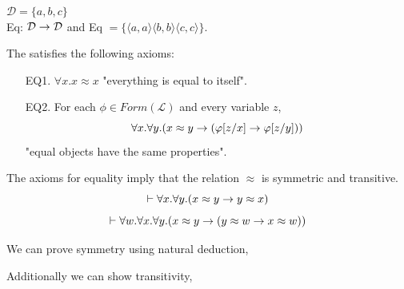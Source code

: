 \documentclass[english, 11pt]{article}
\begin{document}
    \begin{exmp}
      $\mathcal{D} = \{a,b,c\}$ \\
      Eq: $\mathcal{D} \rightarrow \mathcal{D}$ and Eq $= \{\langle a,a\rangle \langle b,b\rangle \langle c, c\rangle \}$.
    \end{exmp}

    The  satisfies the following axioms:
    \begin{itemize}
      \item[EQ1.] $\forall x. x \approx x$ "everything is equal to itself".
      \item[EQ2.] For each $\phi \in Form(\mathcal{L})$ and every variable $z$,
      \[ \forall x. \forall y. (x \approx y \rightarrow (\varphi[z/x] \rightarrow \varphi[z/y])) \]
      "equal objects have the same properties".
    \end{itemize}

    \begin{lem}
      The axioms for equality imply that the relation $\approx$ is symmetric and transitive.
      \[ \vdash \forall x.\forall y. (x \approx y \rightarrow y \approx x) \]
      \[ \vdash \forall w. \forall x. \forall y.(x \approx y \rightarrow (y \approx w \rightarrow x \approx w)) \]
    \end{lem}

    We can prove symmetry using natural deduction,

    \begin{flagderiv}
    \end{flagderiv}

    Additionally we can show transitivity,

    \begin{flagderiv}
    \end{flagderiv}
\end{document}
